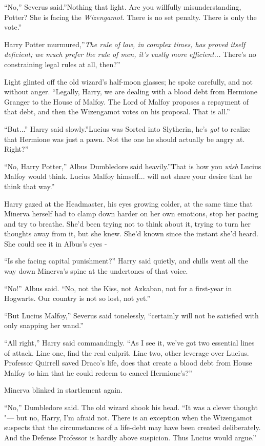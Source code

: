 ``No,'' Severus said.''Nothing that light. Are you willfully
misunderstanding, Potter? She is facing the \emph{Wizengamot}. There is
no set penalty. There is only the vote.''

Harry Potter murmured,''\emph{The rule of law, in complex times, has
proved itself deficient; we much prefer the rule of men, it's vastly
more efficient...} There's no constraining legal rules at all,
then?''

Light glinted off the old wizard's half-moon glasses; he spoke
carefully, and not without anger. ``Legally, Harry, we are dealing with
a blood debt from Hermione Granger to the House of Malfoy. The Lord of
Malfoy proposes a repayment of that debt, and then the Wizengamot votes
on his proposal. That is all.''

``But...'' Harry said slowly.''Lucius was Sorted into Slytherin,
he's \emph{got} to realize that Hermione was just a pawn. Not the one he
should actually be angry at. Right?''

``No, Harry Potter,'' Albus Dumbledore said heavily.''That is how you
\emph{wish} Lucius Malfoy would think. Lucius Malfoy himself...
will not share your desire that he think that way.''

Harry gazed at the Headmaster, his eyes growing colder, at the same time
that Minerva herself had to clamp down harder on her own emotions, stop
her pacing and try to breathe. She'd been trying not to think about it,
trying to turn her thoughts away from it, but she knew. She'd known
since the instant she'd heard. She could see it in Albus's eyes -

``Is she facing capital punishment?'' Harry said quietly, and chills
went all the way down Minerva's spine at the undertones of that voice.

``No!'' Albus said. ``No, not the Kiss, not Azkaban, not for a
first-year in Hogwarts. Our country is not so lost, not yet.''

``But Lucius Malfoy,'' Severus said tonelessly, ``certainly will not be
satisfied with only snapping her wand.''

``All right,'' Harry said commandingly. ``As I see it, we've got two
essential lines of attack. Line one, find the real culprit. Line two,
other leverage over Lucius. Professor Quirrell saved Draco's life, does
that create a blood debt from House Malfoy to him that he could redeem
to cancel Hermione's?''

Minerva blinked in startlement again.

``No,'' Dumbledore said. The old wizard shook his head. ``It was a
clever thought "--- but no, Harry, I'm afraid not. There is an exception
when the Wizengamot suspects that the circumstances of a life-debt may
have been created deliberately. And the Defense Professor is hardly
above suspicion. Thus Lucius would argue.''

